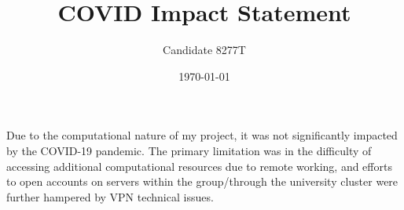\documentclass[11pt,a4paper]{article}
\title{COVID Impact Statement}
\author{Candidate 8277T}
\date{\today}
\begin{document}
	
\maketitle %

Due to the computational nature of my project, it was not significantly impacted by the COVID-19 pandemic. The primary limitation was in the difficulty of accessing additional computational resources due to remote working, and efforts to open accounts on servers within the group/through the university cluster were further hampered by VPN technical issues.
\end{document}

